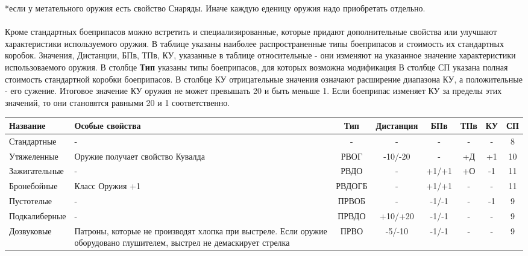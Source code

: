 *если у метательного оружия есть свойство Снаряды. Иначе каждую еденицу оружия надо приобретать отдельно.

\paragraph{} Кроме стандартных боеприпасов можно встретить и специализированные, которые придают дополнительные свойства или улучшают характеристики используемого оружия. В таблице указаны наиболее распространенные типы боеприпасов и стоимость их стандартных коробок.
\newline Значения, Дистанции, БПв, ТПв, КУ, указанные в таблице относительные - они изменяют на указанное значение характеристики использоваемого оружия.
\newline В столбце \textbf{Тип} указаны типы боеприпасов, для которых возможна модификация
\newline В столбце СП указана полная стоимость стандартной коробки боеприпасов.
\newline В столбце КУ отрицательные значения означают расширение диапазона КУ, а положительные - его сужение. Итоговое значение КУ оружия не может превышать 20 и быть меньше 1. Если боеприпас изменяет КУ за пределы этих значений, то они становятся равными 20 и 1 соответственно.

\begin{longtable}{|p{3cm}|p{2.5cm}|c||c|c|c|c||c|}\hline
Название & Особые свойства & Тип & Дистанция & БПв & ТПв & КУ & СП\\ \hline
Стандартные & - & - & - & - & - & - & 8\\ \hline
Утяжеленные & Оружие получает свойство Кувалда & РВОГ & -10/-20 & - & +Д & +1 & 10\\ \hline
Зажигательные & - & РВДО & - & +1/+1 & +О & -1 & 11\\ \hline
Бронебойные & Класс Оружия +1 & РВДОГБ & - & +1/+1 & - & - & 11\\ \hline
Пустотелые & - & ПРВОБ & - & -1/-1 & - & -1 & 9\\ \hline
Подкалиберные & - & ПРВДО & +10/+20 & -1/-1 & - & - & 9\\ \hline
Дозвуковые & Патроны, которые не производят хлопка при выстреле. Если оружие оборудовано глушителем, выстрел не демаскирует стрелка & ПРВО & -5/-10 & -1/-1 & - & - & 9\\ \hline
\end{longtable}